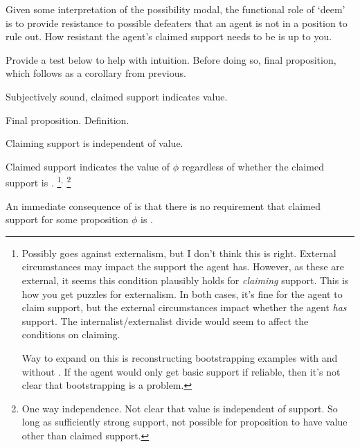 \begin{note}
  Given some interpretation of the possibility modal, the functional role of `deem' is to provide resistance to possible defeaters that an agent is not in a position to rule out.
  How resistant the agent's claimed support needs to be is up to you.

  Provide a test below to help with intuition.
  Before doing so, final proposition, which follows as a corollary from previous.
\end{note}

\begin{note}[\eiS{}]
  Subjectively sound, claimed support indicates value.

  Final proposition.
  Definition.



  Claiming support is independent of value.

  \begin{proposition}[\eiS{-} --- \eiS{}]\label{prop:supp:independence}
    Claimed support indicates the value of \(\phi\)
    regardless of whether the claimed support is \mom{}.
\nolinebreak
    \footnote{
      Possibly goes against externalism, but I don't think this is right.
      External circumstances may impact the support the agent has.
      However, as these are external, it seems this condition plausibly holds for \emph{claiming} support.
      This is how you get puzzles for externalism.
      In both cases, it's fine for the agent to claim support, but the external circumstances impact whether the agent \emph{has} support.
      The internalist/externalist divide would seem to affect the conditions on claiming.

      Way to expand on this is reconstructing bootstrapping examples with and without \eiS{}.
      If the agent would only get basic support if reliable, then it's not clear that bootstrapping is a problem.
    }\(^{,}\)\nolinebreak
    \footnote{
      One way independence.
      Not clear that value is independent of support.
      So long as sufficiently strong support, not possible for proposition to have value other than claimed support.
    }
  \end{proposition}
  An immediate consequence of \eiS{} is that there is no requirement that claimed support for some proposition \(\phi\) is \nmom{}.


\end{note}
